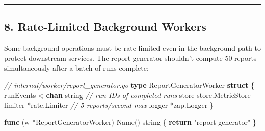 \documentclass[
]{article}
\newenvironment{Shaded}{}{}
\newcommand{\CommentTok}[1]{\textcolor[rgb]{0.38,0.63,0.69}{\textit{#1}}}
\newcommand{\ControlFlowTok}[1]{\textcolor[rgb]{0.00,0.44,0.13}{\textbf{#1}}}
\newcommand{\DataTypeTok}[1]{\textcolor[rgb]{0.56,0.13,0.00}{#1}}
\newcommand{\KeywordTok}[1]{\textcolor[rgb]{0.00,0.44,0.13}{\textbf{#1}}}
\newcommand{\NormalTok}[1]{#1}
\newcommand{\OperatorTok}[1]{\textcolor[rgb]{0.40,0.40,0.40}{#1}}
\newcommand{\StringTok}[1]{\textcolor[rgb]{0.25,0.44,0.63}{#1}}
\begin{document}
\begin{center}\rule{0.5\linewidth}{0.5pt}\end{center}

\hypertarget{rate-limited-background-workers}{%
\subsection{8. Rate-Limited Background
Workers}\label{rate-limited-background-workers}}

Some background operations must be rate-limited even in the background
path to protect downstream services. The report generator shouldn't
compute 50 reports simultaneously after a batch of runs complete:

\begin{Shaded}
\begin{Highlighting}[]
\CommentTok{// internal/worker/report\_generator.go}
\KeywordTok{type}\NormalTok{ ReportGeneratorWorker }\KeywordTok{struct} \OperatorTok{\{}
\NormalTok{    runEvents }\OperatorTok{\textless{}{-}}\KeywordTok{chan} \DataTypeTok{string}       \CommentTok{// run IDs of completed runs}
\NormalTok{    store     store}\OperatorTok{.}\NormalTok{MetricStore}
\NormalTok{    limiter   }\OperatorTok{*}\NormalTok{rate}\OperatorTok{.}\NormalTok{Limiter      }\CommentTok{// 5 reports/second max}
\NormalTok{    logger    }\OperatorTok{*}\NormalTok{zap}\OperatorTok{.}\NormalTok{Logger}
\OperatorTok{\}}

\KeywordTok{func} \OperatorTok{(}\NormalTok{w }\OperatorTok{*}\NormalTok{ReportGeneratorWorker}\OperatorTok{)}\NormalTok{ Name}\OperatorTok{()} \DataTypeTok{string} \OperatorTok{\{} \ControlFlowTok{return} \StringTok{"report{-}generator"} \OperatorTok{\}}


\end{Highlighting}
\end{Shaded}
\end{document}
